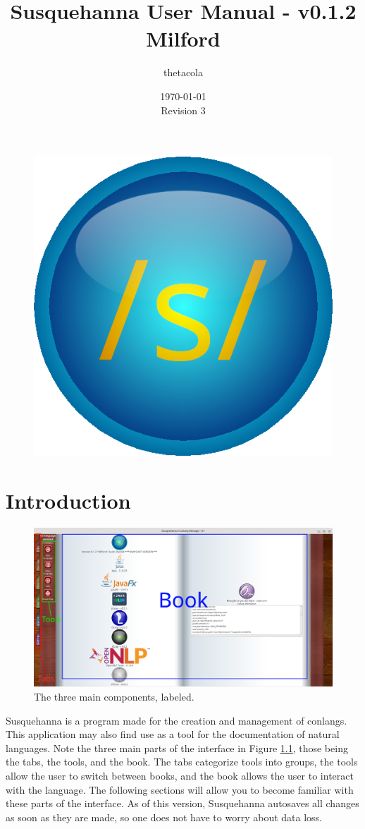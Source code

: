 \documentclass{report}
\title{Susquehanna User Manual - v0.1.2 Milford}
\date{\today\\Revision 3}
\author{thetacola}
\begin{document}
	\begin{figure}
		\centering
		\includegraphics[width=0.7\linewidth]{img/logo}
	\end{figure}
	\maketitle
	\tableofcontents
	\chapter{Introduction}
	\begin{figure}[ht]
		\centering
		\includegraphics[width=1\linewidth]{img/diagram}
		\caption{The three main components, labeled.}
		\label{fig:tabs-diagram-1}
	\end{figure}
	\par
	Susquehanna is a program made for the creation and management of conlangs. This application may also find use as a tool for the documentation of natural languages. Note the three main parts of the interface in Figure \ref{fig:tabs-diagram-1}, those being the tabs, the tools, and the book. The tabs categorize tools into groups, the tools allow the user to switch between books, and the book allows the user to interact with the language. The following sections will allow you to become familiar with these parts of the interface. As of this version, Susquehanna autosaves all changes as soon as they are made, so one does not have to worry about data loss.
\end{document}

